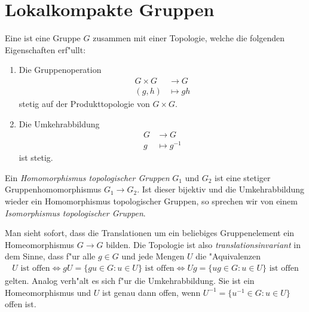 \section{Lokalkompakte Gruppen}
\begin{defi}
	Eine  ist eine Gruppe $G$ zusammen mit einer Topologie, welche die folgenden Eigenschaften erf"ullt:
		\begin{enumerate}[label=(\roman*), leftmargin=*, align=left, labelsep=1pt]
			\item Die Gruppenoperation
				\begin{align*}
					G \times G &\to G\\
					(g,h) &\mapsto gh
				\end{align*}
			stetig auf der Produkttopologie von $G \times G$.
			\item Die Umkehrabbildung
				\begin{align*}
					G &\to G\\
					g &\mapsto g^{-1}
				\end{align*}
				ist stetig.
		\end{enumerate}
	Ein \emph{Homomorphismus topologischer Gruppen} $G_1$ und $G_2$ ist eine stetiger Gruppenhomomorphismus $G_1 \to G_2$.
	Ist dieser bijektiv und die Umkehrabbildung wieder ein Homomorphismus topologischer Gruppen, so sprechen wir von einem \emph{Isomorphismus topologischer Gruppen}.
\end{defi}
	
	Man sieht sofort, dass die Translationen um ein beliebiges Gruppenelement ein Homeomorphismus $G \to G$ bilden.
	Die Topologie ist also \emph{translationsinvariant} in dem Sinne, dass f"ur alle $g \in G$ und jede Mengen $U$ die "Aquivalenzen
	\begin{align*}
		U \text{ ist offen} \Leftrightarrow gU = \{gu \in G: u\in U\} \text{ ist offen} \Leftrightarrow Ug = \{ug \in G: u\in U\} \text{ ist offen}
	\end{align*}
	gelten.
	Analog verh"alt es sich f"ur die Umkehrabbildung. Sie ist ein Homeomorphismus und $U$ ist genau dann offen, wenn $U^{-1}=\{u^{-1}\in G: u \in U\}$ offen ist.
	
